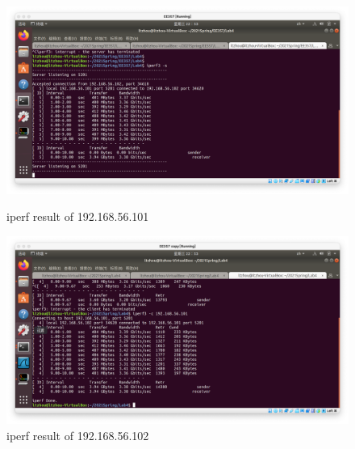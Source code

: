 \begin{exercise}[]
\begin{solution}
  \begin{figure}[ht]
    \begin{center}
    \begin{minipage}[t]{0.48\linewidth}
        \centering
        \includegraphics[width=1\linewidth]{img/lab4/ex2-1-1.png}
        \caption{iperf result of 192.168.56.101}
        \label{fig:ex2-1-1}
    \end{minipage}
    \begin{minipage}[t]{0.48\linewidth}
        \centering
        \includegraphics[width=1\linewidth]{img/lab4/ex2-1-2.png}
        \caption{iperf result of 192.168.56.102}
        \label{fig:ex2-1-2}
    \end{minipage}
    \end{center}
  \end{figure}


\end{solution}
\end{exercise}
